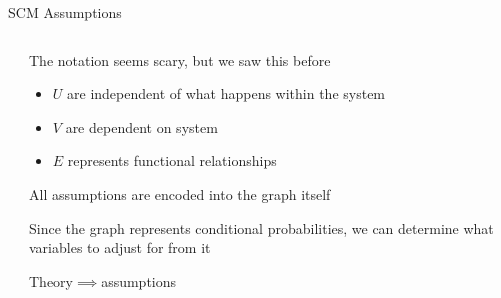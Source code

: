 \documentclass[notes,11pt, aspectratio=169, usenames, dvipsnames]{beamer}
\newenvironment{wideitemize}{\itemize\addtolength{\itemsep}{10pt}}{\enditemize}
\begin{document}
\begin{frame}{SCM Assumptions}
\begin{columns}[c]
\begin{column}{0.38\textwidth}
{\begin{center}
			\end{center}
		}
		\end{column}%
		\hfill
		\begin{column}{0.6\textwidth}
			\begin{wideitemize}
				\item<1-> The notation seems scary, but we saw this before
				\begin{itemize}
					\item<2-> $U$ are independent of what happens within the system
					\item<2-> $V$ are dependent on system
					\item<3-> $E$ represents functional relationships
				\end{itemize}
				\item<4-> All assumptions are encoded into the graph itself
				\item<5-> Since the graph represents conditional probabilities, we can determine what variables to adjust for from it
				\item<6-> Theory$\implies$assumptions
			\end{wideitemize}
		\end{column}
	\end{columns}
\end{frame}
\end{document}
